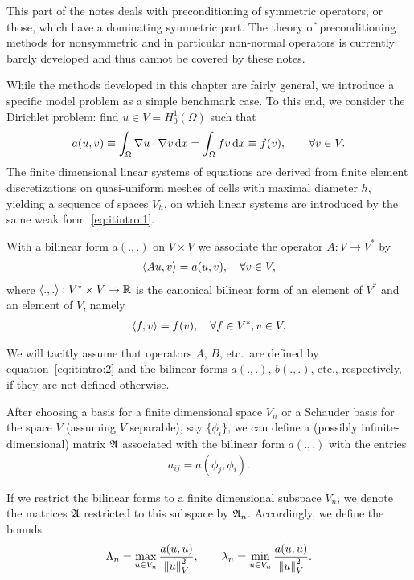 
\begin{remark}
  This part of the notes deals with preconditioning of symmetric
  operators, or those, which have a dominating symmetric part. The
  theory of preconditioning methods for nonsymmetric and in particular
  non-normal operators is currently barely developed and thus cannot
  be covered by these notes. 
\end{remark}

\begin{example}
  While the methods developed in this chapter are fairly general, we
  introduce a specific model problem as a simple benchmark case. To
  this end, we consider the Dirichlet problem: find $u\in V =
  H^1_0(\Omega)$ such that
  \begin{gather}
    \label{eq:itintro:1}
    a(u,v) \equiv \int_\Omega \nabla u\cdot \nabla v \,\mathrm{d} x
    = \int_\Omega f v \,\mathrm{d} x \equiv f(v),
    \qquad \forall v\in V.
  \end{gather}
  The finite dimensional linear systems of equations are derived from
  finite element discretizations on quasi-uniform meshes of cells with
  maximal diameter $h$, yielding a sequence of spaces $V_h$, on which
  linear systems are introduced by the same weak
  form~\eqref{eq:itintro:1}.
\end{example}

\begin{notation}
  With a bilinear form $a(.,.)$ on $V\times V$ we associate the
  operator $A: V\to V^*$ by
  \begin{gather}
    \label{eq:itintro:2}
    \scal(Au,v) = a(u,v), \quad \forall v\in V,
  \end{gather}
  where $\scal(.,.):V^*\times V \to \R$ is the canonical bilinear form of an
  element of $V^*$ and an element of $V$, namely
  \begin{gather}
    \label{eq:richardson:9}
    \scal(f,v) = f(v), \quad \forall f\in V^*, v\in V.
  \end{gather}
  
  We will tacitly assume that operators $A$, $B$, etc.\ are defined by
  equation~\eqref{eq:itintro:2} and the bilinear forms $a(.,.)$,
  $b(.,.)$, etc., respectively, if they are not defined otherwise.
  
  After choosing a basis for a finite dimensional space $V_n$ or a
  Schauder basis for the space $V$ (assuming $V$ separable), say
  $\{\phi_i\}$, we can define a (possibly infinite-dimensional) matrix
  $\mathfrak{A}$ associated with the bilinear form $a(.,.)$ with the entries
  \begin{gather*}
    a_{ij} = a(\phi_j, \phi_i).
  \end{gather*}
  
  If we restrict the bilinear forms to a finite dimensional subspace
  $V_n$, we denote the matrices $\mathfrak{A}$ restricted to this subspace
  by $\mathfrak{A}_n$. Accordingly, we define the bounds
  \begin{gather}
    \label{eq:richardson:8}
    \Lambda_n = \max_{u\in V_n}\frac{a(u,u)}{\left\|u\right\|_V^2},
    \qquad
    \lambda_n = \min_{u\in V_n}\frac{a(u,u)}{\left\|u\right\|_V^2}.
  \end{gather}
\end{notation}

